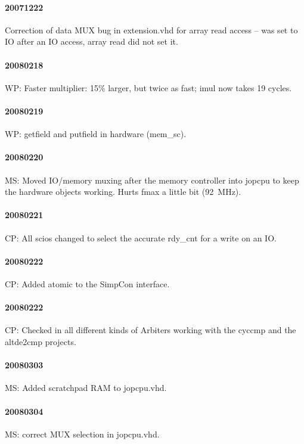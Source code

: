 \documentclass[a4paper,12pt]{scrartcl}
\newcommand{\code}[1]{{\textsf{#1}}}
\begin{document}
\paragraph{20071222} Correction of data MUX bug in \code{extension.vhd} for array read
access -- was set to IO after an IO access, array read did not set
it.

\paragraph{20080218} WP: Faster multiplier: 15\% larger, but twice as
fast; \code{imul} now takes 19 cycles.

\paragraph{20080219} WP: getfield and putfield in hardware
(\code{mem\_sc}).

\paragraph{20080220} MS: Moved IO/memory muxing after the memory controller into
\code{jopcpu} to keep the hardware objects working. Hurts fmax a
little bit (92~MHz).

\paragraph{20080221} CP: All scios changed to select the accurate rdy\_cnt for a write
on an IO.

\paragraph{20080222} CP: Added atomic to the SimpCon interface.

\paragraph{20080222} CP: Checked in all different kinds of Arbiters working with the
\code{cyccmp} and the \code{altde2cmp} projects.

\paragraph{20080303} MS: Added scratchpad RAM to \code{jopcpu.vhd}.

\paragraph{20080304} MS: correct MUX selection in \code{jopcpu.vhd}.
\end{document}
